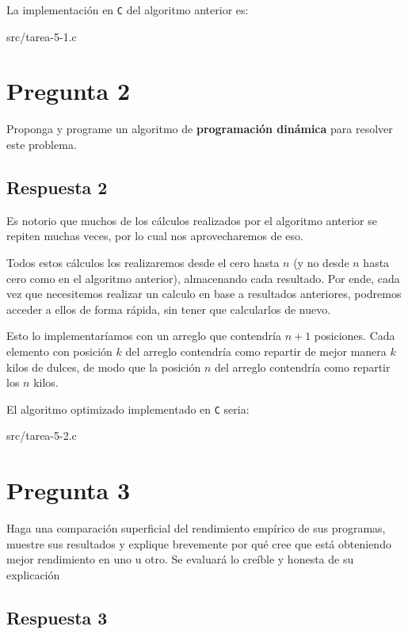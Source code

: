 \documentclass[spanish, fleqn]{article}
\begin{document}
La implementación en \texttt{C} del algoritmo anterior es:

 {src/tarea-5-1.c}

\section{Pregunta 2}

Proponga y programe un algoritmo de \textbf{programación dinámica} para resolver este problema. 

\subsection{Respuesta 2}

Es notorio que muchos de los cálculos realizados por el algoritmo anterior se repiten muchas veces, por lo cual nos aprovecharemos de eso. 

Todos estos cálculos los realizaremos desde el cero hasta $n$ (y no desde $n$ hasta cero como en el algoritmo anterior), almacenando cada resultado. Por ende, cada vez que necesitemos realizar un calculo en base a resultados anteriores, podremos acceder a ellos de forma rápida, sin tener que calcularlos de nuevo.

Esto lo implementaríamos con un arreglo que contendría $n+1$ posiciones. Cada elemento con posición $k$ del arreglo contendría como repartir de mejor manera $k$ kilos de dulces, de modo que la posición $n$ del arreglo contendría como repartir los $n$ kilos.

El algoritmo optimizado implementado en \texttt{C} seria:

 {src/tarea-5-2.c}

\section{Pregunta 3}

Haga una comparación superficial del rendimiento empírico de sus programas, muestre sus resultados y explique brevemente por qué cree que está obteniendo mejor rendimiento en uno u otro. Se evaluará lo creíble y honesta de su explicación

\subsection{Respuesta 3}
\end{document}
